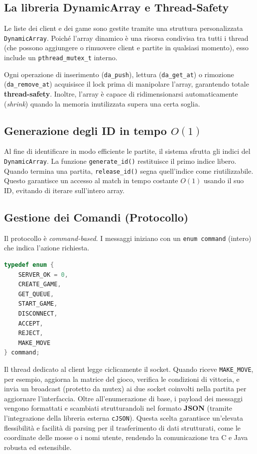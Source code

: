 \documentclass[11pt, a4paper]{article}
\begin{document}
\subsection{La libreria DynamicArray e Thread-Safety}
Le liste dei client e dei game sono gestite tramite una struttura personalizzata \texttt{DynamicArray}. Poiché l'array dinamico è una risorsa condivisa tra tutti i thread (che possono aggiungere o rimuovere client e partite in qualsiasi momento), esso include un \texttt{pthread\_mutex\_t} interno.

Ogni operazione di inserimento (\texttt{da\_push}), lettura (\texttt{da\_get\_at}) o rimozione (\texttt{da\_remove\_at}) acquisisce il lock prima di manipolare l'array, garantendo totale \textbf{thread-safety}. Inoltre, l'array è capace di ridimensionarsi automaticamente (\textit{shrink}) quando la memoria inutilizzata supera una certa soglia.

\subsection{Generazione degli ID in tempo \texorpdfstring{$O(1)$}{O(1)}}
\begin{sloppypar}
Al fine di identificare in modo efficiente le partite, il sistema sfrutta gli indici del \texttt{DynamicArray}. La funzione \texttt{generate\_id()} restituisce il primo indice libero. Quando termina una partita, \texttt{release\_id()} segna quell'indice come riutilizzabile. Questo garantisce un accesso al match in tempo costante $O(1)$ usando il suo ID, evitando di iterare sull'intero array.
\end{sloppypar}

\subsection{Gestione dei Comandi (Protocollo)}
Il protocollo è \textit{command-based}. I messaggi iniziano con un \texttt{enum command} (intero) che indica l'azione richiesta.

\begin{lstlisting}[language=C, caption=Enum dei Comandi]
typedef enum {
    SERVER_OK = 0,
    CREATE_GAME,
    GET_QUEUE,
    START_GAME,
    DISCONNECT,
    ACCEPT,
    REJECT,
    MAKE_MOVE
} command;
\end{lstlisting}

Il thread dedicato al client legge ciclicamente il socket. Quando riceve \texttt{MAKE\_MOVE}, per esempio, aggiorna la matrice del gioco, verifica le condizioni di vittoria, e invia un broadcast (protetto da mutex) ai due socket coinvolti nella partita per aggiornare l'interfaccia. Oltre all'enumerazione di base, i payload dei messaggi vengono formattati e scambiati strutturandoli nel formato \textbf{JSON} (tramite l'integrazione della libreria esterna \texttt{cJSON}). Questa scelta garantisce un'elevata flessibilità e facilità di parsing per il trasferimento di dati strutturati, come le coordinate delle mosse o i nomi utente, rendendo la comunicazione tra C e Java robusta ed estensibile.
\end{document}
